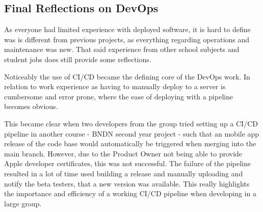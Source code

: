 \documentclass[report/main.tex]{subfiles}
\begin{document}
        \subsection{Final Reflections on DevOps}
        \label{subsec:final-reflections-on-devops}
            As everyone had limited experience with deployed software, it is hard to define was is different from previous projects, as everything regarding operations and maintenance was new. That said experience from other school subjects and student jobs does still provide some reflections.
            
            Noticeably the use of CI/CD became the defining core of the DevOps work. In relation to work experience as having to manually deploy to a server is cumbersome and error prone, where the ease of deploying with a pipeline becomes obvious.
            
            This became clear when two developers from the group tried setting up a CI/CD pipeline in another course - BNDN second year project - such that an mobile app release of the code base would automatically be triggered when merging into the main branch. However, due to the Product Owner not being able to provide Apple developer certificates, this was not successful. The failure of the pipeline resulted in a lot of time used building a release and manually uploading and notify the beta testers, that a new version was available. This really highlights the importance and efficiency of a working CI/CD pipeline when developing in a large group. 
            
\end{document}
